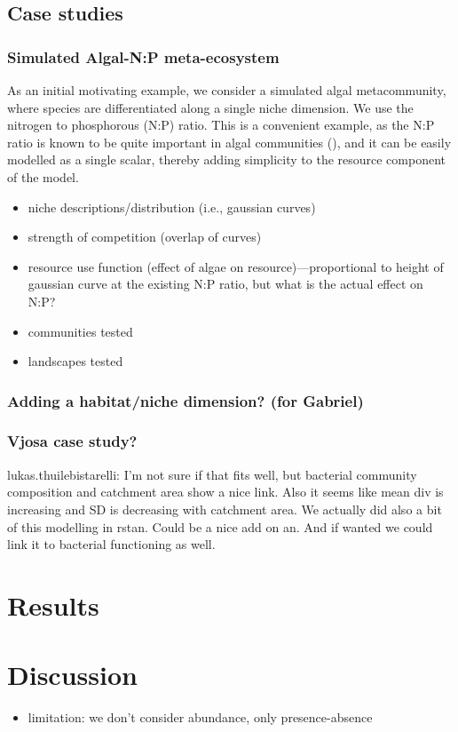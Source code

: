 \subsection{Case studies}

\subsubsection{Simulated Algal-N:P meta-ecosystem}
As an initial motivating example, we consider a simulated algal metacommunity, where species are differentiated along a single niche dimension.
We use the nitrogen to phosphorous (N:P) ratio.
This is a convenient example, as the N:P ratio is known to be quite important in algal communities (), and it can be easily modelled as a single scalar, thereby adding simplicity to the resource component of the model.	

\begin{itemize}
	\item niche descriptions/distribution (i.e., gaussian curves)
	\item strength of competition (overlap of curves)
	\item resource use function (effect of algae on resource)---proportional to height of gaussian curve at the existing N:P ratio, but what is the actual effect on N:P?
	\item communities tested
	\item landscapes tested 
\end{itemize}

\subsubsection{Adding a habitat/niche dimension? (for Gabriel)}

\subsubsection{Vjosa case study?}

lukas.thuilebistarelli: I'm not sure if that fits well, but bacterial community composition and catchment area show a nice link. Also it seems like mean div is increasing and SD is decreasing with catchment area. We actually did also a bit of this modelling in rstan. Could be a nice add on an. And if wanted we could link it to bacterial functioning as well.


\section{Results}

\section{Discussion}

\begin{itemize}
	\item limitation: we don't consider abundance, only presence-absence
\end{itemize}

\printbibliography

